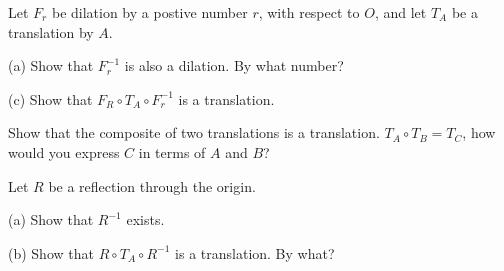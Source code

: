 \begin{tcolorbox}[title=Problem 19, breakable]
    Let $F_r$ be dilation by a postive number $r$,
    with respect to $O$, and let $T_A$ be a translation by $A$.

    (a) Show that $F_r^{-1}$ is also a dilation. By what number?

    (c) Show that $F_R \circ T_A \circ F_r^{-1}$ is a translation.
\end{tcolorbox}

\begin{tcolorbox}[title=Problem 20, breakable]
    Show that the composite of two translations is a translation.
    $T_A \circ T_B = T_C$, how would you express $C$ in terms 
    of $A$ and $B$?
\end{tcolorbox}

\begin{tcolorbox}[title=Problem 21, breakable]
    Let $R$ be a reflection through the origin.

    (a) Show that $R^{-1}$ exists.

    (b) Show that $R \circ T_A \circ R^{-1}$ is a translation. By what?
\end{tcolorbox}

\begin{tcolorbox}[title=Problem 22, breakable]
\end{tcolorbox}

\begin{tcolorbox}[title=Problem 23, breakable]
\end{tcolorbox}

\begin{tcolorbox}[title=Problem 24, breakable]
\end{tcolorbox}

\begin{tcolorbox}[title=Problem 25, breakable]
\end{tcolorbox}

\begin{tcolorbox}[title=Problem 26, breakable]
\end{tcolorbox}

\begin{tcolorbox}[title=Problem 29, breakable]
\end{tcolorbox}

\begin{tcolorbox}[title=Problem 30, breakable]
\end{tcolorbox}

\begin{tcolorbox}[title=Problem 31, breakable]
\end{tcolorbox}

\begin{tcolorbox}[title=Problem 32, breakable]
\end{tcolorbox}